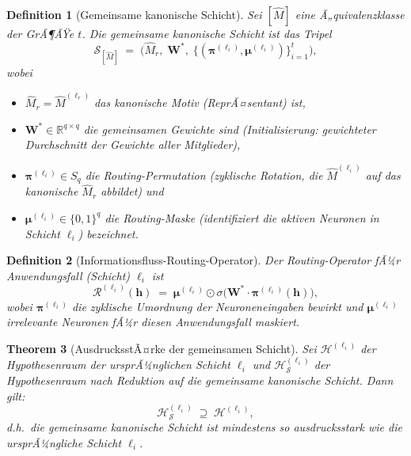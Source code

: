 ﻿\documentclass[12pt, a4paper, openany]{report}
\newtheorem{theorem}{Theorem}[chapter]
\newtheorem{definition}[theorem]{Definition}
\newcommand{\R}{\mathbb{R}}
\newcommand{\calH}{\mathcal{H}}
\newcommand{\calR}{\mathcal{R}}
\newcommand{\calS}{\mathcal{S}}
\begin{document}
\begin{definition}[Gemeinsame kanonische Schicht]
\label{def:shared_layer}
Sei $[\hat{M}]$ eine Ã„quivalenzklasse der GrÃ¶ÃŸe $t$.  Die \emph{gemeinsame
kanonische Schicht} ist das Tripel
\[
  \calS_{[\hat{M}]}
  \;=\;
  \bigl(
    \hat{M}_r,\;
    \bm{W}^*,\;
    \bigl\{(\bm{\pi}^{(\ell_i)}, \bm{\mu}^{(\ell_i)})\bigr\}_{i=1}^{t}
  \bigr),
\]
wobei
\begin{itemize}
  \item $\hat{M}_r = \hat{M}^{(\ell_r)}$ das kanonische Motiv
    (ReprÃ¤sentant) ist,
  \item $\bm{W}^* \in \R^{q \times q}$ die \emph{gemeinsamen Gewichte} sind
    (Initialisierung: gewichteter Durchschnitt der Gewichte aller Mitglieder),
  \item $\bm{\pi}^{(\ell_i)} \in S_q$ die \emph{Routing-Permutation}
    (zyklische Rotation, die $\hat{M}^{(\ell_i)}$ auf das kanonische $\hat{M}_r$
    abbildet) und
  \item $\bm{\mu}^{(\ell_i)} \in \{0,1\}^q$ die
    \emph{Routing-Maske} (identifiziert die aktiven Neuronen in Schicht $\ell_i$)
    bezeichnet.
\end{itemize}
\end{definition}

\begin{definition}[Informationsfluss-Routing-Operator]
\label{def:routing}
Der \emph{Routing-Operator} fÃ¼r Anwendungsfall (Schicht) $\ell_i$ ist
\begin{equation}
  \label{eq:routing_op}
  \calR^{(\ell_i)}(\bm{h})
  \;=\;
  \bm{\mu}^{(\ell_i)} \odot
  \sigma\!\bigl(\bm{W}^* \cdot \bm{\pi}^{(\ell_i)}(\bm{h})\bigr),
\end{equation}
wobei $\bm{\pi}^{(\ell_i)}$ die zyklische Umordnung der Neuroneneingaben
bewirkt und $\bm{\mu}^{(\ell_i)}$ irrelevante Neuronen fÃ¼r diesen
Anwendungsfall maskiert.
\end{definition}

\begin{theorem}[AusdrucksstÃ¤rke der gemeinsamen Schicht]
\label{thm:shared_expressivity}
Sei $\calH^{(\ell_i)}$ der Hypothesenraum der ursprÃ¼nglichen Schicht $\ell_i$
und $\calH_{\calS}^{(\ell_i)}$ der Hypothesenraum nach Reduktion auf die
gemeinsame kanonische Schicht.  Dann gilt:
\begin{equation}
  \label{eq:expr_preservation}
  \calH_{\calS}^{(\ell_i)} \;\supseteq\; \calH^{(\ell_i)},
\end{equation}
d.h.\ die gemeinsame kanonische Schicht ist mindestens so ausdrucksstark wie
die ursprÃ¼ngliche Schicht $\ell_i$.
\end{theorem}
\end{document}
